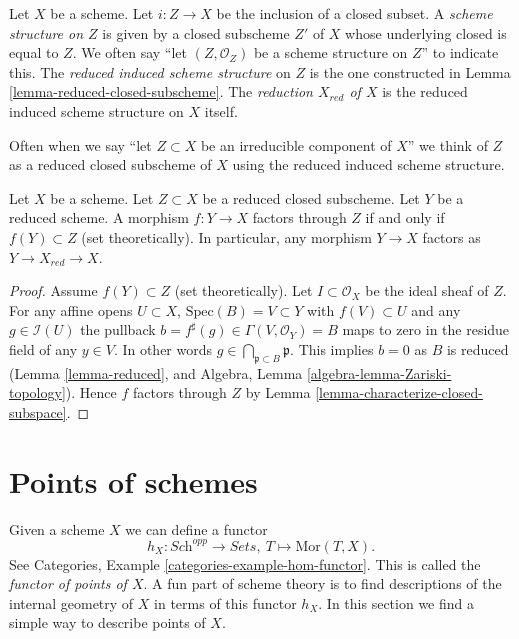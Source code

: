 \begin{definition}
\label{definition-reduced-induced-scheme}
Let $X$ be a scheme. Let $i : Z \to X$ be the inclusion of a closed subset.
A {\it scheme structure on $Z$} is given by a closed subscheme $Z'$ of
$X$ whose underlying closed is equal to $Z$. We often say
``let $(Z, \mathcal{O}_Z)$ be a scheme structure on $Z$'' to
indicate this. The {\it reduced induced scheme structure}
on $Z$ is the one constructed in Lemma \ref{lemma-reduced-closed-subscheme}.
The {\it reduction $X_{red}$ of $X$} is the reduced induced scheme
structure on $X$ itself.
\end{definition}

\noindent
Often when we say ``let $Z \subset X$ be an irreducible component of $X$''
we think of $Z$ as a reduced closed subscheme of $X$ using the reduced induced
scheme structure.

\begin{lemma}
\label{lemma-map-into-reduction}
Let $X$ be a scheme.
Let $Z \subset X$ be a reduced closed subscheme.
Let $Y$ be a reduced scheme.
A morphism $f : Y \to X$ factors through $Z$ if and only if
$f(Y) \subset Z$ (set theoretically). In particular, any
morphism $Y \to X$ factors as $Y \to X_{red} \to X$.
\end{lemma}

\begin{proof}
Assume $f(Y) \subset Z$ (set theoretically).
Let $I \subset \mathcal{O}_X$ be the ideal sheaf of $Z$.
For any affine opens $U \subset X$, $\text{Spec}(B) = V \subset Y$
with $f(V) \subset U$ and any $g \in \mathcal{I}(U)$
the pullback $b = f^\sharp(g) \in \Gamma(V, \mathcal{O}_Y) = B$
maps to zero in the residue field of any $y \in V$.
In other words $g \in \bigcap_{\mathfrak p \subset B} \mathfrak p$.
This implies $b = 0$ as $B$ is reduced (Lemma \ref{lemma-reduced}, and
Algebra, Lemma \ref{algebra-lemma-Zariski-topology}).
Hence $f$ factors through
$Z$ by Lemma \ref{lemma-characterize-closed-subspace}.
\end{proof}










\section{Points of schemes}
\label{section-points}

\noindent
Given a scheme $X$ we can define a functor
$$
h_X : \textit{Sch}^{opp}
\longrightarrow
\textit{Sets}, \ 
T \longmapsto \text{Mor}(T, X).
$$
See Categories, Example \ref{categories-example-hom-functor}.
This is called the {\it functor of points of $X$}.
A fun part of scheme theory is to find descriptions of
the internal geometry of $X$ in terms of this functor $h_X$.
In this section we find a simple way to describe
points of $X$.

